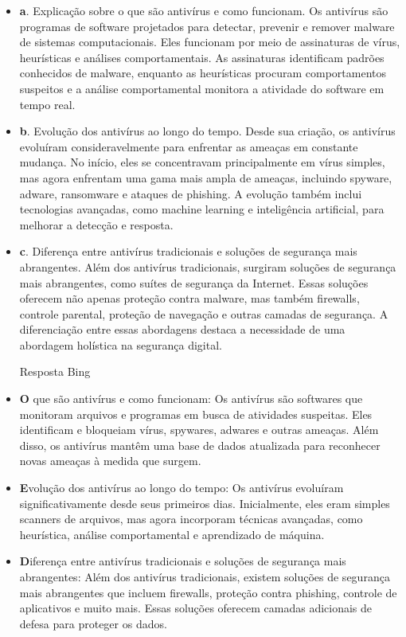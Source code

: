 \documentclass[10pt,conference,twocolumn]{article}
\begin{document}
\begin{itemize}
\item \textbf a. Explicação sobre o que são antivírus e como funcionam.
Os antivírus são programas de software projetados para detectar, prevenir e remover malware de sistemas computacionais. Eles funcionam por meio de assinaturas de vírus, heurísticas e análises comportamentais. As assinaturas identificam padrões conhecidos de malware, enquanto as heurísticas procuram comportamentos suspeitos e a análise comportamental monitora a atividade do software em tempo real.

\item \textbf b. Evolução dos antivírus ao longo do tempo.
Desde sua criação, os antivírus evoluíram consideravelmente para enfrentar as ameaças em constante mudança. No início, eles se concentravam principalmente em vírus simples, mas agora enfrentam uma gama mais ampla de ameaças, incluindo spyware, adware, ransomware e ataques de phishing. A evolução também inclui tecnologias avançadas, como machine learning e inteligência artificial, para melhorar a detecção e resposta.

\item \textbf c. Diferença entre antivírus tradicionais e soluções de segurança mais abrangentes.
Além dos antivírus tradicionais, surgiram soluções de segurança mais abrangentes, como suítes de segurança da Internet. Essas soluções oferecem não apenas proteção contra malware, mas também firewalls, controle parental, proteção de navegação e outras camadas de segurança. A diferenciação entre essas abordagens destaca a necessidade de uma abordagem holística na segurança digital.

Resposta Bing

\item \textbf O que são antivírus e como funcionam: Os antivírus são softwares que monitoram arquivos e programas em busca de atividades suspeitas. Eles identificam e bloqueiam vírus, spywares, adwares e outras ameaças. Além disso, os antivírus mantêm uma base de dados atualizada para reconhecer novas ameaças à medida que surgem.

\item \textbf Evolução dos antivírus ao longo do tempo: Os antivírus evoluíram significativamente desde seus primeiros dias. Inicialmente, eles eram simples scanners de arquivos, mas agora incorporam técnicas avançadas, como heurística, análise comportamental e aprendizado de máquina.

\item \textbf Diferença entre antivírus tradicionais e soluções de segurança mais abrangentes: Além dos antivírus tradicionais, existem soluções de segurança mais abrangentes que incluem firewalls, proteção contra phishing, controle de aplicativos e muito mais. Essas soluções oferecem camadas adicionais de defesa para proteger os dados.
\end{itemize}
\end{document}
